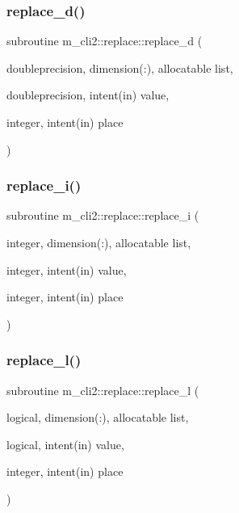\mbox{\label{interfacem__cli2_1_1replace_a606ded35a3f0d06cb61a28db82ab5ae7}} 
\subsubsection{\texorpdfstring{replace\+\_\+d()}{replace\_d()}}
{\footnotesize\ttfamily subroutine m\+\_\+cli2\+::replace\+::replace\+\_\+d (\begin{DoxyParamCaption}\item[{doubleprecision, dimension(\+:), allocatable}]{list,  }\item[{doubleprecision, intent(in)}]{value,  }\item[{integer, intent(in)}]{place }\end{DoxyParamCaption})\hspace{0.3cm}{\ttfamily [private]}}

\mbox{\label{interfacem__cli2_1_1replace_a73a0dab38328c3db8a7eef48e27390bd}} 
\subsubsection{\texorpdfstring{replace\+\_\+i()}{replace\_i()}}
{\footnotesize\ttfamily subroutine m\+\_\+cli2\+::replace\+::replace\+\_\+i (\begin{DoxyParamCaption}\item[{integer, dimension(\+:), allocatable}]{list,  }\item[{integer, intent(in)}]{value,  }\item[{integer, intent(in)}]{place }\end{DoxyParamCaption})\hspace{0.3cm}{\ttfamily [private]}}

\mbox{\label{interfacem__cli2_1_1replace_a9c995edced1d2665777e794a3aa5b2a0}} 
\subsubsection{\texorpdfstring{replace\+\_\+l()}{replace\_l()}}
{\footnotesize\ttfamily subroutine m\+\_\+cli2\+::replace\+::replace\+\_\+l (\begin{DoxyParamCaption}\item[{logical, dimension(\+:), allocatable}]{list,  }\item[{logical, intent(in)}]{value,  }\item[{integer, intent(in)}]{place }\end{DoxyParamCaption})\hspace{0.3cm}{\ttfamily [private]}}

